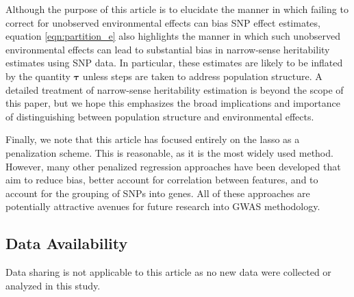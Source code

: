 Although the purpose of this article is to elucidate the manner in which failing to correct for unobserved environmental effects can bias SNP effect estimates, equation \eqref{eqn:partition_e} also highlights the manner in which such unobserved environmental effects can lead to substantial bias in narrow-sense heritability estimates using SNP data. In particular, these estimates are likely to be inflated by the quantity $\boldsymbol{\tau}$ unless steps are taken to address population structure. A detailed treatment of narrow-sense heritability estimation is beyond the scope of this paper, but we hope this emphasizes the broad implications and importance of distinguishing between population structure and environmental effects.

Finally, we note that this article has focused entirely on the lasso as a penalization scheme. This is reasonable, as it is the most widely used method. However, many other penalized regression approaches have been developed that aim to reduce bias, better account for correlation between features, and to account for the grouping of SNPs into genes. All of these approaches are potentially attractive avenues for future research into GWAS methodology.

\subsection*{Data Availability}

Data sharing is not applicable to this article as no new data were collected or analyzed in this study.

